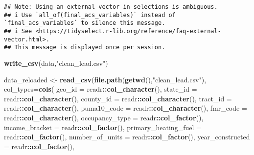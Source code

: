 \documentclass[]{article}
\newenvironment{Shaded}{\begin{snugshade}}{\end{snugshade}}
\newcommand{\DataTypeTok}[1]{\textcolor[rgb]{0.13,0.29,0.53}{#1}}
\newcommand{\KeywordTok}[1]{\textcolor[rgb]{0.13,0.29,0.53}{\textbf{#1}}}
\newcommand{\NormalTok}[1]{#1}
\newcommand{\OperatorTok}[1]{\textcolor[rgb]{0.81,0.36,0.00}{\textbf{#1}}}
\newcommand{\StringTok}[1]{\textcolor[rgb]{0.31,0.60,0.02}{#1}}
\begin{document}
\begin{verbatim}
## Note: Using an external vector in selections is ambiguous.
## i Use `all_of(final_acs_variables)` instead of `final_acs_variables` to silence this message.
## i See <https://tidyselect.r-lib.org/reference/faq-external-vector.html>.
## This message is displayed once per session.
\end{verbatim}

\begin{Shaded}
\begin{Highlighting}[]
\KeywordTok{write_csv}\NormalTok{(data,}\StringTok{"clean_lead.csv"}\NormalTok{)}
\end{Highlighting}
\end{Shaded}

\begin{Shaded}
\begin{Highlighting}[]
\NormalTok{data_reloaded <-}\StringTok{ }\KeywordTok{read_csv}\NormalTok{(}\KeywordTok{file.path}\NormalTok{(}\KeywordTok{getwd}\NormalTok{(),}\StringTok{"clean_lead.csv"}\NormalTok{),}
                          \DataTypeTok{col_types=}\KeywordTok{cols}\NormalTok{(}
                            \DataTypeTok{geo_id =}\NormalTok{ readr}\OperatorTok{::}\KeywordTok{col_character}\NormalTok{(),}
                            \DataTypeTok{state_id =}\NormalTok{ readr}\OperatorTok{::}\KeywordTok{col_character}\NormalTok{(),}
                            \DataTypeTok{county_id =}\NormalTok{ readr}\OperatorTok{::}\KeywordTok{col_character}\NormalTok{(),}
                            \DataTypeTok{tract_id =}\NormalTok{ readr}\OperatorTok{::}\KeywordTok{col_character}\NormalTok{(),}
                            \DataTypeTok{puma10_code =}\NormalTok{ readr}\OperatorTok{::}\KeywordTok{col_character}\NormalTok{(),}
                            \DataTypeTok{fmr_code =}\NormalTok{ readr}\OperatorTok{::}\KeywordTok{col_character}\NormalTok{(),}
                            \DataTypeTok{occupancy_type =}\NormalTok{ readr}\OperatorTok{::}\KeywordTok{col_factor}\NormalTok{(),}
                            \DataTypeTok{income_bracket =}\NormalTok{ readr}\OperatorTok{::}\KeywordTok{col_factor}\NormalTok{(),}
                            \DataTypeTok{primary_heating_fuel =}\NormalTok{ readr}\OperatorTok{::}\KeywordTok{col_factor}\NormalTok{(),}
                            \DataTypeTok{number_of_units =}\NormalTok{ readr}\OperatorTok{::}\KeywordTok{col_factor}\NormalTok{(),}
                            \DataTypeTok{year_constructed =}\NormalTok{ readr}\OperatorTok{::}\KeywordTok{col_factor}\NormalTok{(),}

\end{Highlighting}
\end{Shaded}
\end{document}
